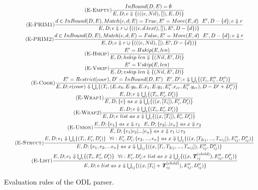 \begin{figure*}[ht!]
\begin{gather*}
  \tag{\sc E-Empty}\label{rule:empty}
  \frac
  {InBound(D,E)=\emptyset}
  {E,D;e \Downarrow \{(((e, Nil), []), E, D)\}}\\
  \tag{\sc E-PRIM1}\label{rule:c1}
  \frac
  {d \in InBound(D,E), Match(e, d; E)=True, E'=Move(E, d) ~~ E',D-\{d\};e \Downarrow r}
  {E,D;e \Downarrow r \cup \{ (((e, d.text), []), E', D-\{d\} ) \} }\\
  \tag{\sc E-PRIM2}\label{rule:c2}
  \frac
  {d \in InBound(D,E), Match(e, d; E)=False, E'=Move(E, d) ~~ E',D-\{d\};e \Downarrow r}
  {E,D;e \Downarrow r \cup \{ (((e, Nil), []), E', D-\{d\} ) \} }\\
  \tag{\sc E-Hskip}\label{rule:hskip}
  \frac
  {E'=Hskip(E,len)}
  {E,D;hskip\ len \Downarrow \{(Nil,E',D)\}   }\\
  \tag{\sc E-Vskip}\label{rule:vskip}
  \frac
  {E'=Vskip(E,len)}
  {E,D;vskip\ len \Downarrow \{(Nil,E',D)\}   }\\
  \tag{\sc E-Coor}\label{rule:coor}
  \frac
  {E'=Restrict(coor), D'=InBound(D,E') ~~ E',D';e \Downarrow \bigcup_{i} \{(T_i, E''_i, D''_i)\}}
  {E,D;e(coor) \Downarrow \bigcup_{i} \{(T_i, (E.x_0, E.y_0, E.x_1, E.y_1, E''_i.x_{cr}, E''_i.y_{cr}), D-D'+D''_i)\}}\\
  \tag{\sc E-Wrap1}\label{rule:wrap1}
  \frac
  {E,D;e \Downarrow \bigcup_i \{(T_i, E'_i, D'_i)\}}
  {E,D;\{e\}\ as\ x \Downarrow \bigcup_i \{((x, [T_i]), E'_i, D'_i)\}} \\
  \tag{\sc E-Wrap2}\label{rule:wrap2}
  \frac
  {E,D;e \Downarrow \bigcup_i \{(T_i, E'_i, D'_i)\}}
  {E,D;e\ list\ as\ x \Downarrow \bigcup_i \{((x, [T_i]), E'_i, D'_i)\}} \\
  \tag{\sc E-Union}\label{rule:union}
  \frac
  {E,D;\{e_1\}\ as\ x \Downarrow r_1 ~~ E,D;\{e_2|..|e_n\}\ as\ x \Downarrow r_2}
  {E,D;\{e_1|e_2|...|e_n\}\ as\ x \Downarrow r_1 \cup r_2}\\
  \tag{\sc E-Struct}\label{rule:struct}
  \frac
  {E,D;e_1 \Downarrow \bigcup_i \{(T_i, E'_i, D'_i)\} ~~
  \forall i: E'_i,D'_i;\{e_2,...,e_n\}\ as\ x \Downarrow
  \bigcup_j \{((x, [T_{2ij},...,T_{nij}]), E''_{ij}, D''_{ij})\}}
  {E,D;\{e_1,e_2,...e_n\}\ as\ x \Downarrow
  \bigcup_{ij} \{((x, [T_i, T_{2ij},...,T_{nij}]), E''_{ij}, D''_{ij})\}}\\  \tag{\sc E-List}\label{rule:list}
  \frac
  {E,D;e_1 \Downarrow \bigcup_i \{(T_i, E'_i, D'_i)\} ~~
  \forall i: E'_i,D'_i;e\ list\ as\ x \Downarrow
  \bigcup_j \{((x, \textbf{\textit{T}}_{ij}^{(child)}), E''_{ij}, D''_{ij})\}}
  {E,D;e\ list\ as\ x \Downarrow
  \bigcup_{ij} \{((x, [T_i] + \textbf{\textit{T}}_{ij}^{(child)}), E''_{ij}, D''_{ij})\}}\\
\end{gather*}
\caption{Evaluation rules of the ODL parser.}
\label{fig:semantics-kangqi}
\end{figure*}
